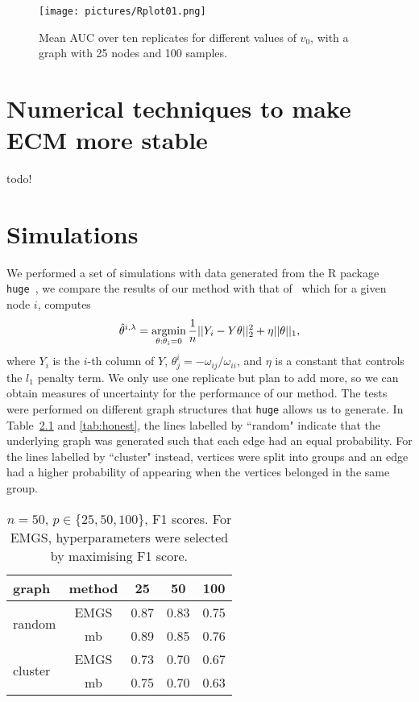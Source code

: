 \documentclass[a4paper, 11pt, oneside]{report}
\DeclareMathOperator{\argmin}{argmin}
\newcommand{\1}{\mathds{1}}
\begin{document}
\begin{figure}
	\label{fig:mean_auc}
	\centering
	\texttt{[image: pictures/Rplot01.png]}
	\caption{Mean AUC over ten replicates for different values of $v_0$, with a
		graph with 25 nodes and 100 samples.}
\end{figure}

\chapter{Numerical techniques to make ECM more stable}
todo!

\chapter{Simulations}
We performed a set of simulations with data generated from the R package
\texttt{huge}~\parencite{huge2020}, we compare the results of our method with that of~\cite{mein2006} which for a given node $i$, computes
\[\hat{\theta}^{i, \lambda} = \argmin\displaylimits_{\theta : \theta_i = 0}\frac{1}{n} ||Y_i - Y \theta||_2^2 + \eta ||\theta||_1,\]
where $Y_i$ is the $i$-th column of $Y$, $\theta_j^i = -\omega_{ij}/\omega_{ii}$, and $\eta$ is a constant that controls the $l_1$ penalty term.
We only use one replicate but plan to add more, so we can obtain measures of uncertainty for the performance of our method.
The tests were performed on different graph structures that \texttt{huge} allows us to generate.
In Table~\ref{tab:cheat} and \ref{tab:honest}, the lines labelled by ``random" indicate that the
underlying graph was generated such that each edge had an equal probability. For the lines labelled by ``cluster" instead, vertices were split
into groups and an edge had a higher probability of appearing when the vertices
belonged in the same group.
\begin{table}
	\centering
	\small
	\caption{$n=50$, $p \in \{25, 50, 100\}$, F1 scores. For EMGS, hyperparameters were selected by maximising F1 score.}\label{tab:cheat}
	\begin{tabular}{|l||c|c|c|c|}
		\hline
		graph                    & method & 25   & 50   & 100  \\
		\hline
		\multirow{2}{*}{random}  & EMGS   & 0.87 & 0.83 & 0.75 \\
		                         & mb     & 0.89 & 0.85 & 0.76 \\
		\hline
		\multirow{2}{*}{cluster} & EMGS   & 0.73 & 0.70 & 0.67 \\
		                         & mb     & 0.75 & 0.70 & 0.63 \\
		\hline
	\end{tabular}
\end{table}
\end{document}
